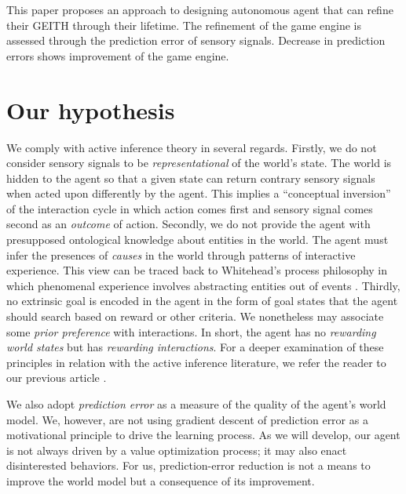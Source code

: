 \documentclass[runningheads]{llncs}
\begin{document}
This paper proposes an approach to designing autonomous agent that can refine their GEITH through their lifetime.
The refinement of the game engine is assessed through 
the prediction error of sensory signals. 
Decrease in prediction errors shows improvement of the game engine. 




\section{Our hypothesis}

We comply with active inference theory in several regards. 
Firstly, we do not consider sensory signals to be \textit{representational} of the world's state. 
The world is hidden to the agent so that a given state can return contrary sensory signals when acted upon differently by the agent.
This implies a ``conceptual inversion'' of the interaction cycle in which action comes first and sensory signal comes second as an  \textit{outcome} of action. 
Secondly, we do not provide the agent with presupposed ontological knowledge about entities in the world. 
The agent must infer the 
presences of \textit{causes} in the world 
through patterns of interactive experience. 
This view can be traced back to Whitehead's process philosophy in which phenomenal experience involves abstracting entities out of events \cite{whitehead1929}. 
Thirdly, no extrinsic goal is encoded in the agent in the form of goal states that the agent should search based on reward or other criteria. 
We nonetheless may associate some \textit{prior preference} with interactions. 
In short, the agent has no \textit{rewarding world states} but has \textit{rewarding interactions}. %
For a deeper examination of these principles in relation with the active inference literature, we refer the reader to our previous article \cite{georgeon_artificial_2024}.

We also adopt \textit{prediction error} as a measure of the quality of the agent's world model. %
We, however, are not using gradient descent of prediction error as a motivational principle to drive the learning process. 
As we will develop, our agent is not always driven by a value optimization process; it may also enact disinterested behaviors.
For us, prediction-error reduction is not a means to improve the world model but a consequence of its improvement.
\end{document}
